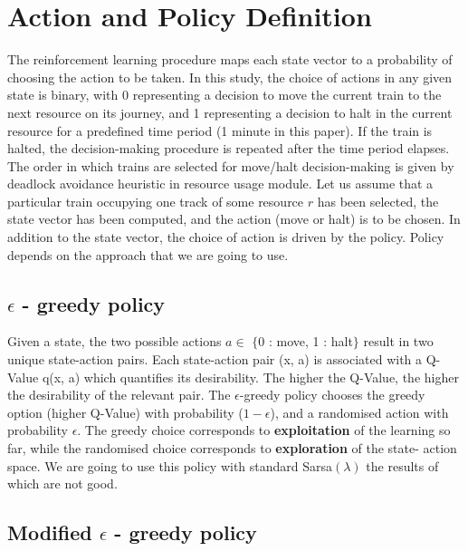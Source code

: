 \section{Action and Policy Definition}
The reinforcement learning procedure maps each state vector
 to a probability of choosing the action to be taken. In this
study, the choice of actions in any given state is binary, with
0 representing a decision to move the current train to the next
resource on its journey, and 1 representing a decision to halt
in the current resource for a predefined time period (1 minute
in this paper). If the train is halted, the decision-making
procedure is repeated after the time period elapses. The order
in which trains are selected for move/halt decision-making is given 
by deadlock avoidance heuristic in resource usage module. Let us assume that
a particular train occupying one track of some resource $r$ has
been selected, the state vector has been computed, and the
action (move or halt) is to be chosen. In addition to the state
vector, the choice of action is driven by the policy. Policy depends on the approach that we are going to use. 

\subsection{ $\epsilon$ - greedy policy}
Given a state, the two possible actions $a \in$  $\{$0 : move, 1 : halt$\}$ result in two unique
state-action pairs. Each state-action pair (x, a) is associated
with a Q-Value q(x, a) which quantifies its desirability. The higher the Q-Value, the higher the
desirability of the relevant pair. The $\epsilon$-greedy policy chooses
the greedy option (higher Q-Value) with probability ($1 - \epsilon$),
and a randomised action with probability $\epsilon$. The greedy choice
corresponds to \textbf{exploitation} of the learning so far, while the
randomised choice corresponds to \textbf{exploration} of the state-
action space. We are going to use this policy with standard Sarsa$(\lambda)$ the results of 
which are not good.

\subsection{Modified $\epsilon$ - greedy policy}


